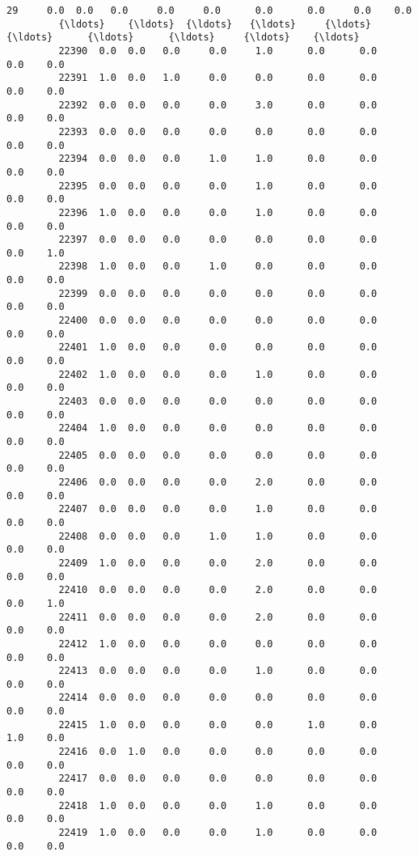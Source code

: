 \documentclass[11pt]{article}
\begin{document}
\begin{Verbatim}[commandchars=\\\{\}]
         29     0.0  0.0   0.0     0.0     0.0      0.0      0.0     0.0    0.0   
         {\ldots}    {\ldots}  {\ldots}   {\ldots}     {\ldots}     {\ldots}      {\ldots}      {\ldots}     {\ldots}    {\ldots}   
         22390  0.0  0.0   0.0     0.0     1.0      0.0      0.0     0.0    0.0   
         22391  1.0  0.0   1.0     0.0     0.0      0.0      0.0     0.0    0.0   
         22392  0.0  0.0   0.0     0.0     3.0      0.0      0.0     0.0    0.0   
         22393  0.0  0.0   0.0     0.0     0.0      0.0      0.0     0.0    0.0   
         22394  0.0  0.0   0.0     1.0     1.0      0.0      0.0     0.0    0.0   
         22395  0.0  0.0   0.0     0.0     1.0      0.0      0.0     0.0    0.0   
         22396  1.0  0.0   0.0     0.0     1.0      0.0      0.0     0.0    0.0   
         22397  0.0  0.0   0.0     0.0     0.0      0.0      0.0     0.0    1.0   
         22398  1.0  0.0   0.0     1.0     0.0      0.0      0.0     0.0    0.0   
         22399  0.0  0.0   0.0     0.0     0.0      0.0      0.0     0.0    0.0   
         22400  0.0  0.0   0.0     0.0     0.0      0.0      0.0     0.0    0.0   
         22401  1.0  0.0   0.0     0.0     0.0      0.0      0.0     0.0    0.0   
         22402  1.0  0.0   0.0     0.0     1.0      0.0      0.0     0.0    0.0   
         22403  0.0  0.0   0.0     0.0     0.0      0.0      0.0     0.0    0.0   
         22404  1.0  0.0   0.0     0.0     0.0      0.0      0.0     0.0    0.0   
         22405  0.0  0.0   0.0     0.0     0.0      0.0      0.0     0.0    0.0   
         22406  0.0  0.0   0.0     0.0     2.0      0.0      0.0     0.0    0.0   
         22407  0.0  0.0   0.0     0.0     1.0      0.0      0.0     0.0    0.0   
         22408  0.0  0.0   0.0     1.0     1.0      0.0      0.0     0.0    0.0   
         22409  1.0  0.0   0.0     0.0     2.0      0.0      0.0     0.0    0.0   
         22410  0.0  0.0   0.0     0.0     2.0      0.0      0.0     0.0    1.0   
         22411  0.0  0.0   0.0     0.0     2.0      0.0      0.0     0.0    0.0   
         22412  1.0  0.0   0.0     0.0     0.0      0.0      0.0     0.0    0.0   
         22413  0.0  0.0   0.0     0.0     1.0      0.0      0.0     0.0    0.0   
         22414  0.0  0.0   0.0     0.0     0.0      0.0      0.0     0.0    0.0   
         22415  1.0  0.0   0.0     0.0     0.0      1.0      0.0     1.0    0.0   
         22416  0.0  1.0   0.0     0.0     0.0      0.0      0.0     0.0    0.0   
         22417  0.0  0.0   0.0     0.0     0.0      0.0      0.0     0.0    0.0   
         22418  1.0  0.0   0.0     0.0     1.0      0.0      0.0     0.0    0.0   
         22419  1.0  0.0   0.0     0.0     1.0      0.0      0.0     0.0    0.0   
         

\end{Verbatim}
\end{document}
